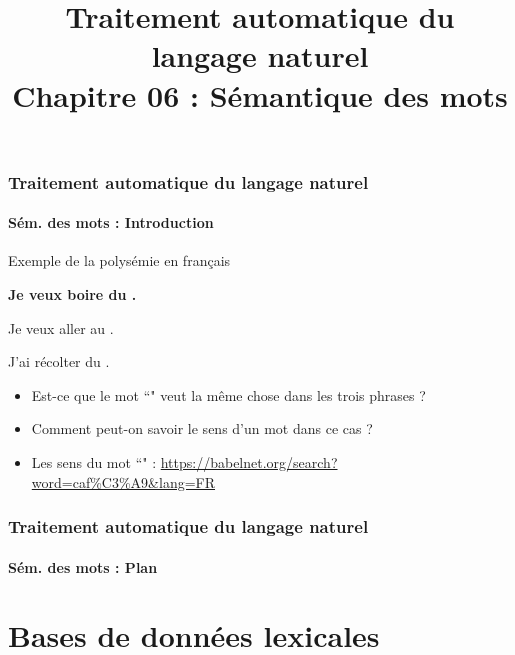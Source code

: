 \documentclass[xcolor=table]{beamer}
\title[TALN : 06- Sém. des mots]%
{Traitement automatique du langage naturel\\Chapitre 06 : Sémantique des mots}
\begin{document}
	
\begin{frame}
\frametitle{Traitement automatique du langage naturel}
\framesubtitle{Sém. des mots : Introduction}

\begin{exampleblock}{Exemple de la polysémie en français}
	\begin{center}
		\Large\bfseries
			Je veux boire du .
			
			Je veux aller au .
			
			J'ai récolter du .
	\end{center}
\end{exampleblock}

\begin{itemize}
	\item Est-ce que le mot ``" veut la même chose dans les trois phrases ?
	\item Comment peut-on savoir le sens d'un mot dans ce cas ?
	\item Les sens du mot ``" : \url{https://babelnet.org/search?word=caf\%C3\%A9&lang=FR}
\end{itemize}

\end{frame}

%
%

\begin{frame}
\frametitle{Traitement automatique du langage naturel}
\framesubtitle{Sém. des mots : Plan}

\begin{multicols}{2}
\tableofcontents
\end{multicols}
\end{frame}

\section{Bases de données lexicales}
\end{document}
